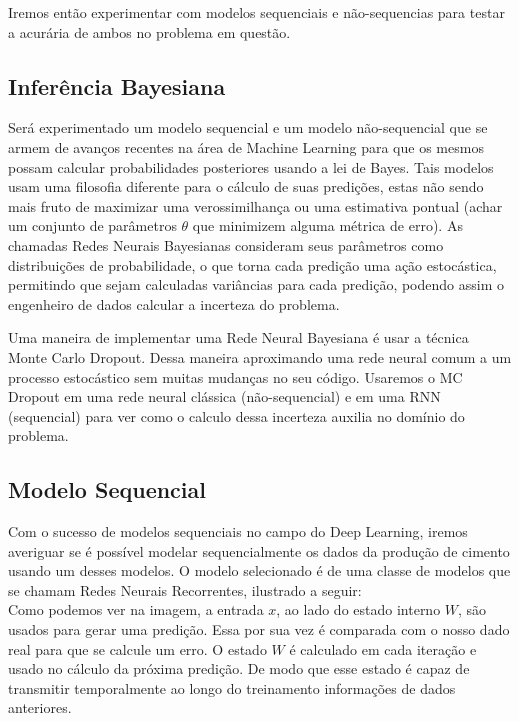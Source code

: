Iremos então experimentar com modelos sequenciais e não-sequencias para testar a acurária de ambos no problema em questão.



\subsection{Inferência Bayesiana}

Será experimentado um modelo sequencial e um modelo não-sequencial que se armem de avanços recentes na área de Machine Learning para que os mesmos possam calcular probabilidades posteriores usando a lei de Bayes. Tais modelos usam uma filosofia diferente para o cálculo de suas predições, estas não sendo mais fruto de maximizar uma verossimilhança ou uma estimativa pontual (achar um conjunto de parâmetros $\theta$ que minimizem alguma métrica de erro). As chamadas Redes Neurais Bayesianas consideram seus parâmetros como distribuições de probabilidade, o que torna cada predição uma ação estocástica, permitindo que sejam calculadas variâncias para cada predição, podendo assim o engenheiro de dados calcular a incerteza do problema.

Uma maneira de implementar uma Rede Neural Bayesiana é usar a técnica Monte Carlo Dropout. Dessa maneira aproximando uma rede neural comum a um processo estocástico sem muitas mudanças no seu código. Usaremos o MC Dropout em uma rede neural clássica (não-sequencial) e em uma RNN (sequencial) para ver como o calculo dessa incerteza auxilia no domínio do problema.

\subsection{Modelo Sequencial}
Com o sucesso de modelos sequenciais no campo do Deep Learning, iremos averiguar se é possível modelar sequencialmente os dados da produção de cimento usando um desses modelos. O modelo selecionado é de uma classe de modelos que se chamam Redes Neurais Recorrentes, ilustrado a seguir:
\\


% 

Como podemos ver na imagem, a entrada $x$, ao lado do estado interno $W$, são usados para gerar uma predição. Essa por sua vez é comparada com o nosso dado real para que se calcule um erro. O estado $W$ é calculado em cada iteração e usado no cálculo da próxima predição. De modo que esse estado é capaz de transmitir temporalmente ao longo do treinamento informações de dados anteriores.
\\

